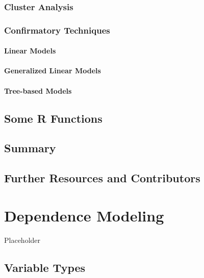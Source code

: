 \documentclass[]{book}
\theoremstyle{definition}
\theoremstyle{definition}
\theoremstyle{definition}
\theoremstyle{remark}
\begin{document}
\subsection{Cluster Analysis}\label{cluster-analysis}

\subsection{Confirmatory Techniques}\label{confirmatory-techniques}

\subsubsection{Linear Models}\label{linear-models}

\subsubsection{Generalized Linear
Models}\label{generalized-linear-models}

\subsubsection{Tree-based Models}\label{tree-based-models}

\section{Some R Functions}\label{some-r-functions}

\section{Summary}\label{summary}

\section{Further Resources and
Contributors}\label{DS:further-reading-and-resources}

\chapter{Dependence Modeling}\label{C:DependenceModel}

Placeholder

\section{Variable Types}\label{S:VarTypes}
\end{document}
